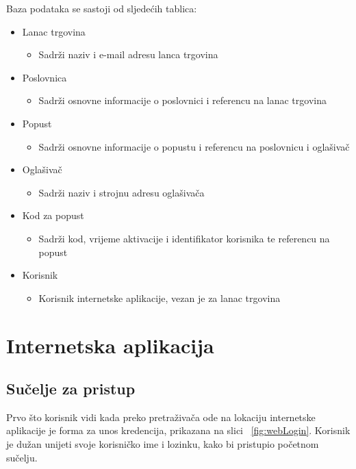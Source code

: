 Baza podataka se sastoji od sljede\'{c}ih tablica:
\begin{itemize}
	\item Lanac trgovina
	\begin{itemize}
		\item Sadr\v{z}i naziv i e-mail adresu lanca trgovina
	\end{itemize}
	\item Poslovnica
	\begin{itemize}
		\item Sadr\v{z}i osnovne informacije o poslovnici i referencu na lanac trgovina
	\end{itemize}
	\item Popust
	\begin{itemize}
		\item Sadr\v{z}i osnovne informacije o popustu i referencu na poslovnicu i ogla\v{s}iva\v{c}
	\end{itemize}
	\item Ogla\v{s}iva\v{c}
	\begin{itemize}
		\item Sadr\v{z}i naziv i strojnu adresu ogla\v{s}iva\v{c}a
	\end{itemize}
	\item Kod za popust
	\begin{itemize}
		\item Sadr\v{z}i kod, vrijeme aktivacije i identifikator korisnika te referencu na popust
	\end{itemize}
	\item Korisnik
	\begin{itemize}
		\item Korisnik internetske aplikacije, vezan je za lanac trgovina
	\end{itemize}
\end{itemize}



\section{Internetska aplikacija}

\subsection{Su\v{c}elje za pristup}

Prvo \v{s}to korisnik vidi kada preko pretra\v{z}iva\v{c}a ode na lokaciju internetske aplikacije je forma za unos kredencija, prikazana na slici ~\ref{fig:webLogin}. Korisnik je du\v{z}an unijeti svoje korisni\v{c}ko ime i lozinku, kako bi pristupio po\v{c}etnom su\v{c}elju.

